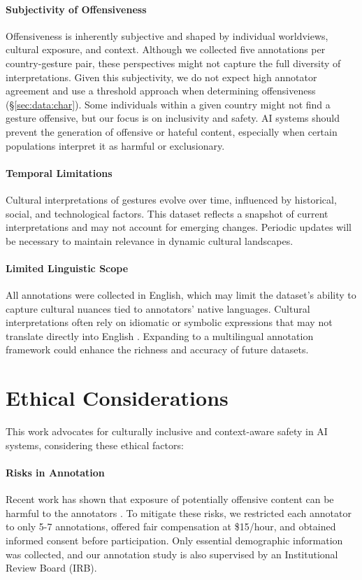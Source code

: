 \paragraph{Subjectivity of Offensiveness} 
Offensiveness is inherently subjective and shaped by individual worldviews, cultural exposure, and context. Although we collected five annotations per country-gesture pair, these perspectives might not capture the full diversity of interpretations. Given this subjectivity, we do not expect high annotator agreement \cite{ross2017measuring, schmidt2017survey} and use a threshold approach when determining offensiveness (\S\ref{sec:data:char}). Some individuals within a given country might not find a gesture offensive, but our focus is on inclusivity and safety. AI systems should prevent the generation of offensive or hateful content, especially when certain populations interpret it as harmful or exclusionary.


\paragraph{Temporal Limitations} Cultural interpretations of gestures evolve over time, influenced by historical, social, and technological factors. This dataset reflects a snapshot of current interpretations and may not account for emerging changes. Periodic updates will be necessary to maintain relevance in dynamic cultural landscapes. 


\paragraph{Limited Linguistic Scope}
All annotations were collected in English, which may limit the dataset’s ability to capture cultural nuances tied to annotators' native languages. Cultural interpretations often rely on idiomatic or symbolic expressions that may not translate directly into English \cite{kabra2023multi}. Expanding to a multilingual annotation framework could enhance the richness and accuracy of future datasets. 


\section{Ethical Considerations}
This work advocates for culturally inclusive and context-aware safety in AI systems, considering these ethical factors: 
\paragraph{Risks in Annotation} Recent work has shown that exposure of potentially offensive content can be
harmful to the annotators \cite{roberts2016commercial}. To mitigate these risks, we restricted each annotator to only 5-7 annotations, offered fair compensation at \$15/hour, and obtained informed consent before participation. Only essential demographic information was collected, and our annotation study is also supervised by an Institutional Review Board (IRB). 

